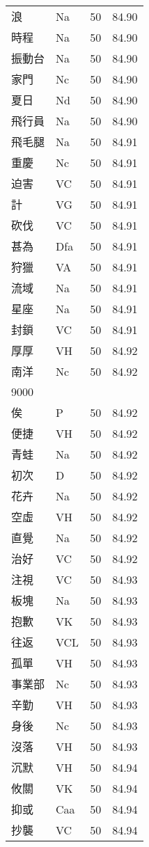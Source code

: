 \documentclass[twocolumn]{book}
\begin{document}
\begin{supertabular}{llrr}
浪 & Na & 50 &  84.90\\
時程 & Na & 50 &  84.90\\
振動台 & Na & 50 &  84.90\\
家門 & Nc & 50 &  84.90\\
夏日 & Nd & 50 &  84.90\\
飛行員 & Na & 50 &  84.90\\
飛毛腿 & Na & 50 &  84.91\\
重慶 & Nc & 50 &  84.91\\
迫害 & VC & 50 &  84.91\\
計 & VG & 50 &  84.91\\
砍伐 & VC & 50 &  84.91\\
甚為 & Dfa & 50 &  84.91\\
狩獵 & VA & 50 &  84.91\\
流域 & Na & 50 &  84.91\\
星座 & Na & 50 &  84.91\\
封鎖 & VC & 50 &  84.91\\
厚厚 & VH & 50 &  84.92\\
南洋 & Nc & 50 &  84.92\\
9000\\
俟 & P & 50 &  84.92\\
便捷 & VH & 50 &  84.92\\
青蛙 & Na & 50 &  84.92\\
初次 & D & 50 &  84.92\\
花卉 & Na & 50 &  84.92\\
空虛 & VH & 50 &  84.92\\
直覺 & Na & 50 &  84.92\\
治好 & VC & 50 &  84.92\\
注視 & VC & 50 &  84.93\\
板塊 & Na & 50 &  84.93\\
抱歉 & VK & 50 &  84.93\\
往返 & VCL & 50 &  84.93\\
孤單 & VH & 50 &  84.93\\
事業部 & Nc & 50 &  84.93\\
辛勤 & VH & 50 &  84.93\\
身後 & Nc & 50 &  84.93\\
沒落 & VH & 50 &  84.93\\
沉默 & VH & 50 &  84.94\\
攸關 & VK & 50 &  84.94\\
抑或 & Caa & 50 &  84.94\\
抄襲 & VC & 50 &  84.94\\

\end{supertabular}
\end{document}
